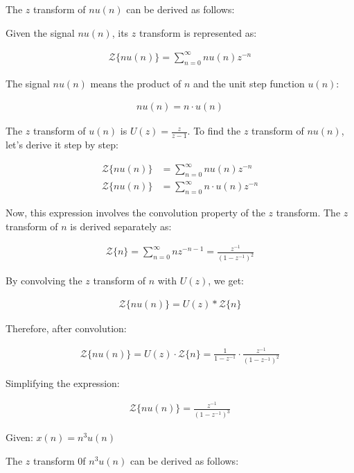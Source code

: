 \documentclass{article}
\begin{document}
The $z$ transform of $nu(n)$ can be derived as follows:

Given the signal $nu(n)$, its $z$ transform is represented as:

\begin{align}
\mathcal{Z}\{nu(n)\} = \sum_{n=0}^{\infty} nu(n)z^{-n}
\end{align}

The signal $nu(n)$ means the product of $n$ and the unit step function $u(n)$:

\begin{align}
nu(n) = n \cdot u(n)
\end{align}

The $z$ transform of $u(n)$ is $U(z) = \frac{z}{z-1}$. To find the $z$ transform of $nu(n)$, let's derive it step by step:

\begin{align}
\mathcal{Z}\{nu(n)\} &= \sum_{n=0}^{\infty} nu(n)z^{-n} \nonumber\\
\mathcal{Z}\{nu(n)\}&= \sum_{n=0}^{\infty} n \cdot u(n)z^{-n}
\end{align}

Now, this expression involves the convolution property of the $z$ transform. The $z$ transform of $n$ is derived separately as:

\begin{align}
\mathcal{Z}\{n\} = \sum_{n=0}^{\infty} nz^{-n-1} = \frac{z^{-1}}{(1-z^{-1})^2}
\end{align}

By convolving the $z$ transform of $n$ with $U(z)$, we get:

\begin{align}
\mathcal{Z}\{nu(n)\} = U(z) * \mathcal{Z}\{n\}
\end{align}

Therefore, after convolution:

\begin{align}
\mathcal{Z}\{nu(n)\} = U(z) \cdot \mathcal{Z}\{n\} = \frac{1}{1-z^{-1}} \cdot \frac{z^{-1}}{(1-z^{-1})^2}
\end{align}

Simplifying the expression:

\begin{align}
\mathcal{Z}\{nu(n)\} = \frac{z^{-1}}{(1-z^{-1})^3}
\end{align}


Given: $x(n) = n^3u(n)$

The $z$ transform 0f $n^3u(n)$ can be derived as follows:
\end{document}

